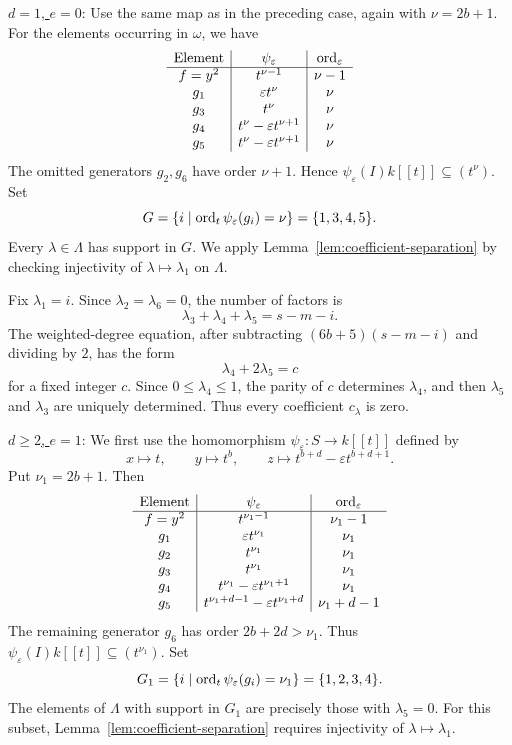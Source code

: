 \noindent
\underline{$d=1$, $e=0$}:
Use the same map as in the preceding case, again with $\nu=2b+1$.  For the
elements occurring in $\omega$, we have
\[
\begin{array}{c|c|c}
 \text{Element}&\psi_\varepsilon&\operatorname{ord}_\varepsilon\\ \hline
 f=y^2&t^{\nu-1}&\nu-1\\
 g_1&\varepsilon t^\nu&\nu\\
 g_3&t^\nu&\nu\\
 g_4&t^\nu-\varepsilon t^{\nu+1}&\nu\\
 g_5&t^\nu-\varepsilon t^{\nu+1}&\nu
\end{array}
\]
The omitted generators $g_2,g_6$ have order $\nu+1$. Hence
$\psi_\varepsilon(I)k[[t]]\subseteq(t^\nu)$. Set
\[
 G=\{i\mid\operatorname{ord}_t\psi_\varepsilon(g_i)=\nu\}=\{1,3,4,5\}.
\]
Every $\lambda\in\Lambda$ has support in $G$.
We apply Lemma~\ref{lem:coefficient-separation} by checking
injectivity of $\lambda\mapsto\lambda_1$ on $\Lambda$.

Fix $\lambda_1=i$.  Since $\lambda_2=\lambda_6=0$, the number of factors is
$$
\lambda_3+\lambda_4+\lambda_5=s-m-i.
$$
The weighted-degree equation, after subtracting
$(6b+5)(s-m-i)$ and dividing by $2$, has the form
$$
\lambda_4+2\lambda_5=c
$$
for a fixed integer $c$.  Since $0\leq\lambda_4\leq1$, the parity of $c$
determines $\lambda_4$, and then $\lambda_5$ and $\lambda_3$ are uniquely
determined.  Thus every coefficient $c_\lambda$ is zero.

\medskip

\noindent
\underline{$d\geq2$, $e=1$}:
We first use the homomorphism $\psi_\varepsilon\colon S\to k[[t]]$ defined by
$$
x\longmapsto t,\qquad
y\longmapsto t^b,\qquad
z\longmapsto t^{b+d}-\varepsilon t^{b+d+1}.
$$
Put $\nu_1=2b+1$.  Then
\[
\begin{array}{c|c|c}
 \text{Element}&\psi_\varepsilon&\operatorname{ord}_\varepsilon\\ \hline
 f=y^2&t^{\nu_1-1}&\nu_1-1\\
 g_1&\varepsilon t^{\nu_1}&\nu_1\\
 g_2&t^{\nu_1}&\nu_1\\
 g_3&t^{\nu_1}&\nu_1\\
 g_4&t^{\nu_1}-\varepsilon t^{\nu_1+1}&\nu_1\\
 g_5&t^{\nu_1+d-1}-\varepsilon t^{\nu_1+d}&\nu_1+d-1
\end{array}
\]
The remaining generator $g_6$ has order $2b+2d>\nu_1$.
Thus $\psi_\varepsilon(I)k[[t]]\subseteq(t^{\nu_1})$. Set
\[
 G_1=\{i\mid\operatorname{ord}_t\psi_\varepsilon(g_i)=\nu_1\}=\{1,2,3,4\}.
\]
The elements of $\Lambda$ with support in $G_1$ are precisely those with $\lambda_5=0$. For this subset,
Lemma~\ref{lem:coefficient-separation} requires injectivity of
$\lambda\mapsto\lambda_1$.

